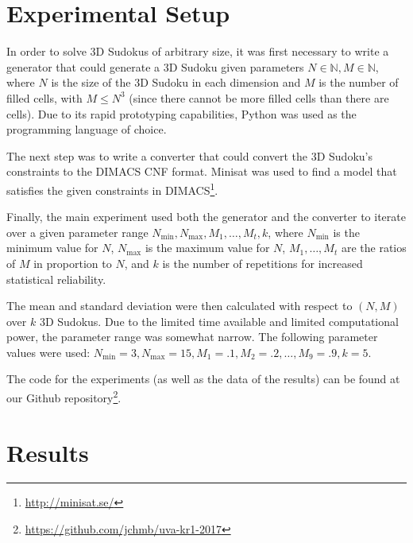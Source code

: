 \section{Experimental Setup}

In order to solve 3D Sudokus of arbitrary size, it was first necessary to write a generator that could generate a 3D Sudoku given parameters $N \in \mathbb{N}, M \in \mathbb{N}$, where $N$ is the size of the 3D Sudoku in each dimension and $M$ is the number of filled cells, with $M \leq N^3$ (since there cannot be more filled cells than there are cells). Due to its rapid prototyping capabilities, Python was used as the programming language of choice.


The next step was to write a converter that could convert the 3D Sudoku's constraints to the DIMACS CNF format. Minisat was used to find a model that satisfies the given constraints in DIMACS\footnote{\url{http://minisat.se/}}.

Finally, the main experiment used both the generator and the converter to iterate over a given parameter range $N_{\min}, N_{\max}, M_1, \hdots, M_t, k$, where $N_{\min}$ is the minimum value for $N$, $N_{\max}$ is the maximum value for $N$, $M_1, \hdots, M_t$ are the ratios of $M$ in proportion to $N$, and $k$ is the number of repetitions for increased statistical reliability. 

The mean and standard deviation were then calculated with respect to $(N, M)$ over $k$ 3D Sudokus. Due to the limited time available and limited computational power, the parameter range was somewhat narrow. The following parameter values were used: $N_{\min} = 3, N_{\max} = 15, M_1 = .1, M_2 = .2, \hdots, M_9 = .9, k = 5$.

The code for the experiments (as well as the data of the results) can be found at our Github repository\footnote{\url{https://github.com/jchmb/uva-kr1-2017}}. 



\section{Results}

